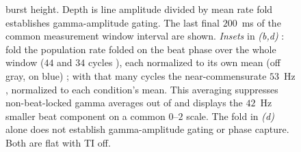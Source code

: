 \documentclass[11pt,a4paper]{article}
\providecommand{\DIFaddtex}[1]{{\protect\color{blue} \sf #1}} %
\providecommand{\DIFdeltex}[1]{{\protect\color{red} \scriptsize #1}} %
\providecommand{\DIFaddFL}[1]{\DIFadd{#1}} %
\providecommand{\DIFdelFL}[1]{\DIFdel{#1}} %
\providecommand{\DIFaddbeginFL}{} %
\providecommand{\DIFaddendFL}{} %
\providecommand{\DIFdelbeginFL}{} %
\providecommand{\DIFdelendFL}{} %
\providecommand{\DIFadd}[1]{\texorpdfstring{\DIFaddtex{#1}}{#1}} %
\providecommand{\DIFdel}[1]{\texorpdfstring{\DIFdeltex{#1}}{}} %
\begin{document}
\begin{figure}[t!]
{{burst height. Depth is line amplitude divided by mean }\DIFaddendFL rate\DIFdelbeginFL \DIFdelFL{fold establishes gamma-amplitude gating}\DIFdelendFL . The \DIFdelbeginFL \DIFdelFL{last }\DIFdelendFL \DIFaddbeginFL \DIFaddFL{final }\DIFaddendFL $200$~ms of the
\DIFaddbeginFL \DIFaddFL{common }\DIFaddendFL measurement \DIFdelbeginFL \DIFdelFL{window }\DIFdelendFL \DIFaddbeginFL \DIFaddFL{interval }\DIFaddendFL are shown. \emph{Insets} in \emph{(b,d)} \DIFdelbeginFL \DIFdelFL{: }\DIFdelendFL \DIFaddbeginFL \DIFaddFL{fold }\DIFaddendFL the
\DIFdelbeginFL \DIFdelFL{population }\DIFdelendFL rate \DIFdelbeginFL \DIFdelFL{folded }\DIFdelendFL on \DIFdelbeginFL \DIFdelFL{the }\DIFdelendFL beat phase over \DIFdelbeginFL \DIFdelFL{the whole window (}\DIFdelendFL $44$ and $34$ cycles \DIFdelbeginFL \DIFdelFL{), each normalized to its own mean }\DIFdelendFL (off gray, on blue)\DIFdelbeginFL \DIFdelFL{; with that many cycles
the near-commensurate $53$~Hz }\DIFdelendFL \DIFaddbeginFL \DIFaddFL{, normalized to each
condition's mean. This averaging suppresses non-beat-locked }\DIFaddendFL gamma \DIFdelbeginFL \DIFdelFL{averages out of }\DIFdelendFL \DIFaddbeginFL \DIFaddFL{and displays }\DIFaddendFL the
\DIFdelbeginFL \DIFdelFL{$42$~Hz }\DIFdelendFL \DIFaddbeginFL \DIFaddFL{smaller beat component on a common $0$--$2$ scale. The }\DIFaddendFL fold \DIFdelbeginFL \DIFdelFL{in \emph{(d)}}\DIFdelendFL \DIFaddbeginFL \DIFaddFL{alone does not establish
gamma-amplitude gating or phase capture}\DIFaddendFL .\DIFdelbeginFL \DIFdelFL{Both
are flat with TI off.}\DIFdelendFL }
\label{fig:qif_raster}
\end{figure}
\end{document}
